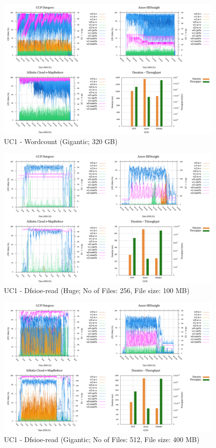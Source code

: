 \documentclass[review]{elsarticle}
\begin{document}
\begin{figure}[p]
	\caption{UC1 - Wordcount (Gigantic; 320 GB)}
	\label{fig:uc1-wrdcnt-g-cmidt}
	\includegraphics[width=\textwidth]{uc1-wrdcnt-g-cmidt}
	\centering
\end{figure}

\begin{figure}[p]
	\caption{UC1 - Dfsioe-read (Huge; No of Files: 256, File size: 100 MB)}
	\label{fig:uc1-dfsioer-h-cmidt}
	\includegraphics[width=\textwidth]{uc1-dfsioer-h-cmidt}
	\centering
\end{figure}

\begin{figure}[p]
	\caption{UC1 - Dfsioe-read (Gigantic; No of Files: 512, File size: 400 MB)}
	\label{fig:uc1-dfsioer-g-cmidt}
	\includegraphics[width=\textwidth]{uc1-dfsioer-g-cmidt}
	\centering
\end{figure}
\end{document}
